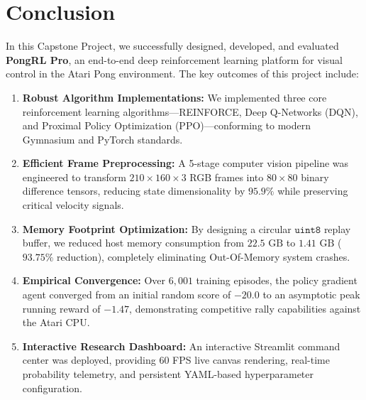 \documentclass[12pt,a4paper]{report}
\begin{document}
\section{Conclusion}
In this Capstone Project, we successfully designed, developed, and evaluated \textbf{PongRL Pro}, an end-to-end deep reinforcement learning platform for visual control in the Atari Pong environment. The key outcomes of this project include:
\begin{enumerate}
    \item \textbf{Robust Algorithm Implementations:} We implemented three core reinforcement learning algorithms—REINFORCE, Deep Q-Networks (DQN), and Proximal Policy Optimization (PPO)—conforming to modern Gymnasium and PyTorch standards.
    \item \textbf{Efficient Frame Preprocessing:} A 5-stage computer vision pipeline was engineered to transform $210 \times 160 \times 3$ RGB frames into $80 \times 80$ binary difference tensors, reducing state dimensionality by $95.9\%$ while preserving critical velocity signals.
    \item \textbf{Memory Footprint Optimization:} By designing a circular $\texttt{uint8}$ replay buffer, we reduced host memory consumption from $22.5\text{ GB}$ to $1.41\text{ GB}$ ($93.75\%$ reduction), completely eliminating Out-Of-Memory system crashes.
    \item \textbf{Empirical Convergence:} Over $6,001$ training episodes, the policy gradient agent converged from an initial random score of $-20.0$ to an asymptotic peak running reward of $-1.47$, demonstrating competitive rally capabilities against the Atari CPU.
    \item \textbf{Interactive Research Dashboard:} An interactive Streamlit command center was deployed, providing 60 FPS live canvas rendering, real-time probability telemetry, and persistent YAML-based hyperparameter configuration.
\end{enumerate}
\end{document}
